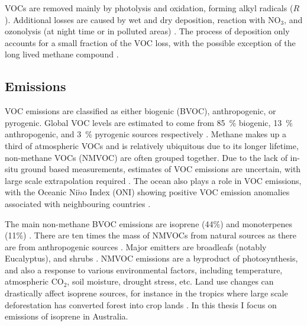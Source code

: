   VOCs are removed mainly by photolysis and oxidation, forming alkyl radicals ($R\dot{}$).
  Additional losses are caused by wet and dry deposition, reaction with NO$_3$, and ozonolysis (at night time or in polluted areas) \parencite{AtkinsonArey2003, Brown2009}.
  The process of deposition only accounts for a small fraction of the VOC loss, with the possible exception of the long lived methane compound \parencite{AtkinsonArey2003}.
  
  
  \subsection{Emissions}
    \label{LR:VOCs:Emissions}
    
    VOC emissions are classified as either biogenic (BVOC), anthropogenic, or pyrogenic.
    Global VOC levels are estimated to come from 85~\% biogenic, 13~\% anthropogenic, and 3~\% pyrogenic sources respectively \parencite{Kanakidou2005, Kefauver2014}.
    Methane makes up a third of atmospheric VOCs and is relatively ubiquitous due to its longer lifetime, non-methane VOCs (NMVOC) are often grouped together.
    Due to the lack of in-situ ground based measurements, estimates of VOC emissions are uncertain, with large scale extrapolation required \parencite{Millet2006}.
    The ocean also plays a role in VOC emissions, with the Oceanic Ni$\tilde{n}$o Index (ONI) showing positive VOC emission anomalies associated with neighbouring countries \parencite{Stavrakou2014}.
    
    The main non-methane BVOC emissions are isoprene (44\%) and monoterpenes (11\%) \parencite{Guenther2000, Kefauver2014}. 
    There are ten times the mass of NMVOCs from natural sources as there are from anthropogenic sources \parencite{Guenther2006, Kanakidou2005, Millet2006}.
    Major emitters are broadleafs (notably Eucalyptus), and shrubs \parencite{Guenther2006, Arneth2008, Niinemets2010, Monks2015}.
    NMVOC emissions are a byproduct of photosynthesis, and also a response to various environmental factors, including temperature, atmospheric CO$_2$, soil moisture, drought stress, etc.
    Land use changes can drastically affect isoprene sources, for instance in the tropics where large scale deforestation has converted forest into crop lands \parencite{Kanakidou2005}.
    In this thesis I focus on emissions of isoprene in Australia.
    
